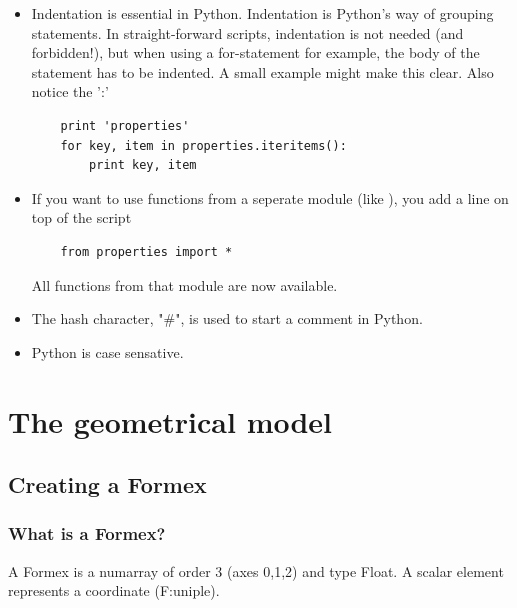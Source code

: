 {\begin{itemize}
\begin{itemize}
Simply put: you can either set the arguments in the right order and only give their value, or you can give arguments by their name and value. This last option holds some advantages: not only is it easier to check what you did, but sometimes a function has many arguments with default values and you only want to change a few.
If this isn't entirely clear yet, just look at the examples later in this tutorial or check the Python tutorial.
	\item Indentation is essential in Python. Indentation is Python's way of grouping statements. In straight-forward scripts, indentation is not needed (and forbidden!), but when using a for-statement for example, the body of the statement has to be indented. A small example might make this clear. Also notice the ':' 
\begin{verbatim}
	print 'properties'
	for key, item in properties.iteritems():
	    print key, item
\end{verbatim}
	\item If you want to use functions from a seperate module (like ), you add a line on top of the script
\begin{verbatim}
	from properties import *
\end{verbatim}
All functions from that module are now available.
	\item The hash character, "\#", is used to start a comment in Python.
	\item Python is case sensative.
	\end{itemize}
\end{itemize}


\section{The geometrical model}
\label{sec:geom}


\subsection{Creating a Formex}
\label{subsec:create}

\subsubsection{What is a Formex?}
A Formex is a numarray of order 3 (axes 0,1,2) and type Float.
A scalar element represents a coordinate (F:uniple).

}
